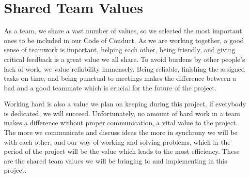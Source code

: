 \section{Shared Team Values}
As a team, we share a vast number of values, so we selected the most important ones to be included in our Code of Conduct. As we are working together, a good sense of teamwork is important, helping each other, being friendly, and giving critical feedback is a great value we all share. To avoid burdens by other people’s lack of work, we value reliability immensely. Being reliable, finishing the assigned tasks on time, and being punctual to meetings makes the difference between a bad and a good teammate which is crucial for the future of the project.

Working hard is also a value we plan on keeping during this project, if everybody is dedicated, we will succeed. Unfortunately, no amount of hard work in a team makes a difference without proper communication, a vital value to the project. The more we communicate and discuss ideas the more in synchrony we will be with each other, and our way of working and solving problems, which in the period of the project will be the value which leads to the most efficiency. These are the shared team values we will be bringing to and implementing in this project.

 
